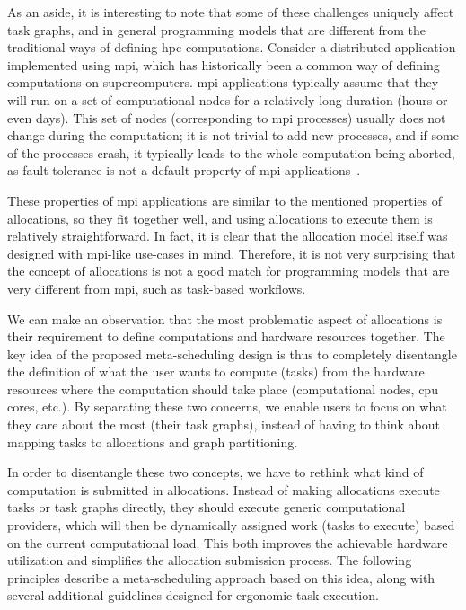 As an aside, it is interesting to note that some of these challenges uniquely affect task graphs,
and in general programming models that are different from the traditional ways of defining
\gls{hpc} computations. Consider a distributed application implemented using
\gls{mpi}, which has historically been a common way of defining computations on
supercomputers. \gls{mpi} applications typically assume that they will run on a set
of computational nodes for a relatively long duration (hours or even days). This set of nodes
(corresponding to \gls{mpi} processes) usually does not change during the
computation; it is not trivial to add new processes, and if some of the processes crash, it
typically leads to the whole computation being aborted, as fault tolerance is not a default
property of \gls{mpi} applications~\cite{fault_tolerant_mpi}.

These properties of \gls{mpi} applications are similar to the mentioned properties of
allocations, so they fit together well, and using allocations to execute them is relatively
straightforward. In fact, it is clear that the allocation model itself was designed with
\gls{mpi}-like use-cases in mind. Therefore, it is not very surprising that the
concept of allocations is not a good match for programming models that are very different from
\gls{mpi}, such as task-based workflows.

We can make an observation that the most problematic aspect of allocations is their requirement to
define computations and hardware resources together. The key idea of the proposed meta-scheduling
design is thus to completely disentangle the definition of what the user wants to compute (tasks)
from the hardware resources where the computation should take place (computational nodes,
\gls{cpu} cores, etc.). By separating these two concerns, we enable users to focus on
what they care about the most (their task graphs), instead of having to think about mapping tasks
to allocations and graph partitioning.

In order to disentangle these two concepts, we have to rethink what kind of computation is
submitted in allocations. Instead of making allocations execute tasks or task graphs directly, they
should execute generic computational providers, which will then be dynamically assigned work (tasks
to execute) based on the current computational load. This both improves the achievable hardware
utilization and simplifies the allocation submission process. The following principles describe a
meta-scheduling approach based on this idea, along with several additional guidelines designed for ergonomic task execution.

